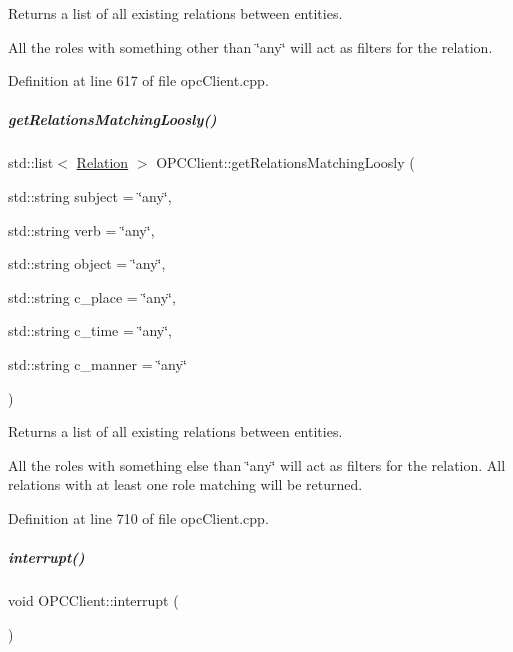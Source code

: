 Returns a list of all existing relations between entities. 

All the roles with something other than \char`\"{}any\char`\"{} will act as filters for the relation. 

Definition at line 617 of file opc\+Client.\+cpp.

\mbox{\label{group__icubclient__clients_a9eb229857b2afdf17304e8bdd6fb2b61}} 
\subparagraph{\texorpdfstring{get\+Relations\+Matching\+Loosly()}{getRelationsMatchingLoosly()}}
{\footnotesize\ttfamily std\+::list$<$ \hyperlink{group__icubclient__representations_classicubclient_1_1Relation}{Relation} $>$ O\+P\+C\+Client\+::get\+Relations\+Matching\+Loosly (\begin{DoxyParamCaption}\item[{std\+::string}]{subject = {\ttfamily \char`\"{}any\char`\"{}},  }\item[{std\+::string}]{verb = {\ttfamily \char`\"{}any\char`\"{}},  }\item[{std\+::string}]{object = {\ttfamily \char`\"{}any\char`\"{}},  }\item[{std\+::string}]{c\+\_\+place = {\ttfamily \char`\"{}any\char`\"{}},  }\item[{std\+::string}]{c\+\_\+time = {\ttfamily \char`\"{}any\char`\"{}},  }\item[{std\+::string}]{c\+\_\+manner = {\ttfamily \char`\"{}any\char`\"{}} }\end{DoxyParamCaption})}



Returns a list of all existing relations between entities. 

All the roles with something else than \char`\"{}any\char`\"{} will act as filters for the relation. All relations with at least one role matching will be returned. 

Definition at line 710 of file opc\+Client.\+cpp.

\mbox{\label{group__icubclient__clients_a319df571cac4fc425832546234cda426}} 
\subparagraph{\texorpdfstring{interrupt()}{interrupt()}}
{\footnotesize\ttfamily void O\+P\+C\+Client\+::interrupt (\begin{DoxyParamCaption}{ }\end{DoxyParamCaption})}



